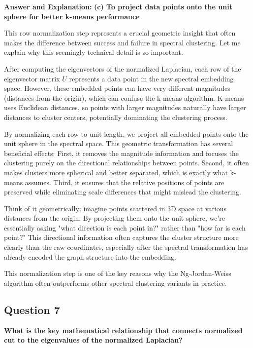 \documentclass[11pt]{article}
\newenvironment{answer}{\color{answercolor}\begin{framed}\textbf{Answer and Explanation:}}{\end{framed}}
\begin{document}
\begin{answer}
\textbf{(c) To project data points onto the unit sphere for better k-means performance}

This row normalization step represents a crucial geometric insight that often makes the difference between success and failure in spectral clustering. Let me explain why this seemingly technical detail is so important.

After computing the eigenvectors of the normalized Laplacian, each row of the eigenvector matrix $U$ represents a data point in the new spectral embedding space. However, these embedded points can have very different magnitudes (distances from the origin), which can confuse the k-means algorithm. K-means uses Euclidean distances, so points with larger magnitudes naturally have larger distances to cluster centers, potentially dominating the clustering process.

By normalizing each row to unit length, we project all embedded points onto the unit sphere in the spectral space. This geometric transformation has several beneficial effects: First, it removes the magnitude information and focuses the clustering purely on the directional relationships between points. Second, it often makes clusters more spherical and better separated, which is exactly what k-means assumes. Third, it ensures that the relative positions of points are preserved while eliminating scale differences that might mislead the clustering.

Think of it geometrically: imagine points scattered in 3D space at various distances from the origin. By projecting them onto the unit sphere, we're essentially asking "what direction is each point in?" rather than "how far is each point?" This directional information often captures the cluster structure more clearly than the raw coordinates, especially after the spectral transformation has already encoded the graph structure into the embedding.

This normalization step is one of the key reasons why the Ng-Jordan-Weiss algorithm often outperforms other spectral clustering variants in practice.
\end{answer}

\subsection{Question 7}
\textbf{What is the key mathematical relationship that connects normalized cut to the eigenvalues of the normalized Laplacian?}
\end{document}
